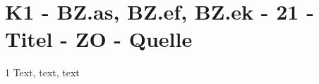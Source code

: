\section{K1 - BZ.as, BZ.ef, BZ.ek - 21 - Titel - ZO - Quelle}

\begin{langesbeispiel}\item[1] %
Text, text, text

\end{langesbeispiel}